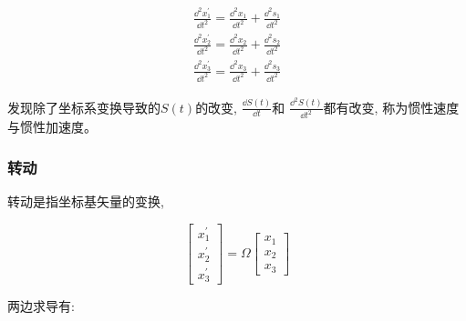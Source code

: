 \documentclass{ctexart}
\numberwithin{equation}{subsection}
\numberwithin{theorem}{subsection}
\numberwithin{definition}{subsection}
\numberwithin{proof}{subsection}
\numberwithin{lemma}{subsection}
\numberwithin{example}{subsection}
\numberwithin{remark}{subsection}
\numberwithin{corollary}{subsection}
\numberwithin{exercise}{subsection}
\numberwithin{problem}{subsection}
\numberwithin{question}{section}
\numberwithin{method}{subsection}
\begin{document}
        \begin{equation}
            \begin{aligned}
                \frac{\dd^2 x_1^\prime}{\dd t^2} = \frac{\dd^2 x_1}{\dd t^2} + \frac{\dd^2 s_1}{\dd t^2} \\
                \frac{\dd^2 x_2^\prime}{\dd t^2} = \frac{\dd^2 x_2}{\dd t^2} + \frac{\dd^2 s_2}{\dd t^2} \\
                \frac{\dd^2 x_3^\prime}{\dd t^2} = \frac{\dd^2 x_3}{\dd t^2} + \frac{\dd^2 s_3}{\dd t^2}
            \end{aligned}
        \end{equation}

        发现除了坐标系变换导致的$S(t)$的改变, $\frac{\dd S(t)}{\dd t}$和
        $\frac{\dd^2 S(t)}{\dd t^2}$都有改变, 称为惯性速度与惯性加速度。

    \subsubsection{转动}

        转动是指坐标基矢量的变换, 

        \begin{equation}
            \begin{bmatrix}
                x_1^\prime \\
                x_2^\prime \\
                x_3^\prime
            \end{bmatrix} = \Omega \begin{bmatrix}
                x_1 \\
                x_2 \\
                x_3
            \end{bmatrix}
        \end{equation}

        两边求导有:
\end{document}
